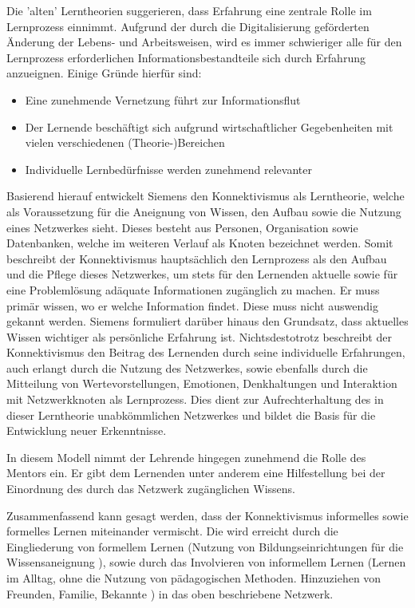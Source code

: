 Die 'alten' Lerntheorien suggerieren, dass Erfahrung eine zentrale Rolle im Lernprozess einnimmt. Aufgrund der durch die Digitalisierung geförderten Änderung der Lebens- und Arbeitsweisen, wird es immer schwieriger alle für den Lernprozess erforderlichen Informationsbestandteile sich durch Erfahrung anzueignen.\cite[S. 159ff.]{Erpenbeck.2007} Einige Gründe hierfür sind:
\begin{itemize}
	\item Eine zunehmende Vernetzung führt zur Informationsflut
	\item Der Lernende beschäftigt sich aufgrund wirtschaftlicher Gegebenheiten mit vielen verschiedenen (Theorie-)Bereichen
	\item Individuelle Lernbedürfnisse werden zunehmend relevanter
\end{itemize}
Basierend hierauf entwickelt Siemens den Konnektivismus als Lerntheorie, welche als Voraussetzung für die Aneignung von Wissen, den Aufbau sowie die Nutzung eines Netzwerkes sieht. Dieses besteht aus Personen, Organisation sowie Datenbanken, welche im weiteren Verlauf als Knoten bezeichnet werden. Somit beschreibt der Konnektivismus hauptsächlich den Lernprozess als den Aufbau und die Pflege dieses Netzwerkes, um stets für den Lernenden aktuelle sowie für eine Problemlösung adäquate Informationen zugänglich zu machen.
\label{RolleLernender}
Er muss primär wissen, wo er welche Information findet. Diese muss nicht auswendig gekannt werden. Siemens formuliert darüber hinaus den Grundsatz, dass aktuelles Wissen wichtiger als persönliche Erfahrung ist. Nichtsdestotrotz beschreibt der Konnektivismus den Beitrag des Lernenden durch seine individuelle Erfahrungen, auch erlangt durch die Nutzung des Netzwerkes, sowie ebenfalls durch die Mitteilung von Wertevorstellungen, Emotionen, Denkhaltungen und Interaktion mit Netzwerkknoten als Lernprozess. Dies dient zur Aufrechterhaltung des in dieser Lerntheorie unabkömmlichen Netzwerkes und bildet die Basis für die Entwicklung neuer Erkenntnisse.

In diesem Modell nimmt der Lehrende hingegen zunehmend die Rolle des Mentors ein. Er gibt dem Lernenden unter anderem eine Hilfestellung bei der Einordnung des durch das Netzwerk zugänglichen Wissens.

Zusammenfassend kann gesagt werden, dass der Konnektivismus informelles sowie formelles Lernen miteinander vermischt.\cite[S. 47ff.]{Kuhlmann.2008} Die wird erreicht durch die Eingliederung von formellem Lernen (Nutzung von Bildungseinrichtungen für die Wissensaneignung \cite[S. 75]{Hellmer.2007}), sowie durch das Involvieren von informellem Lernen (Lernen im Alltag, ohne die Nutzung von pädagogischen Methoden. Hinzuziehen von Freunden, Familie, Bekannte \cite[S. 76]{Hellmer.2007}) in das oben beschriebene Netzwerk.  


